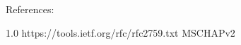 \documentclass[oneside, final, 14pt]{extarticle}
\begin{document}
References:

1.0 https://tools.ietf.org/rfc/rfc2759.txt MSCHAPv2
\end{document}
